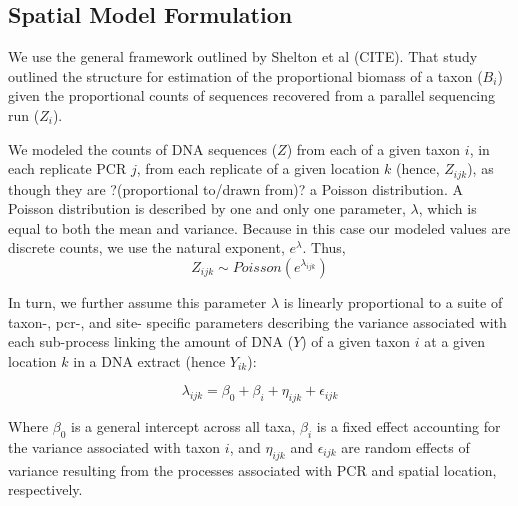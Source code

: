 \documentclass[11pt,letterpaper]{article} %
\begin{document}
\subsection*{Spatial Model Formulation}
We use the general framework outlined by Shelton et al (CITE).
That study outlined the structure for estimation of the proportional biomass of a taxon ($B_i$) given the proportional counts of sequences recovered from a parallel sequencing run ($Z_i$).

We modeled the counts of DNA sequences ($Z$) from each of a given taxon $i$, in each replicate PCR $j$, from each replicate of a given location $k$ (hence, $Z_{ijk}$), as though they are ?(proportional to/drawn from)? a Poisson distribution. A Poisson distribution is described by one and only one parameter, $\lambda$, which is equal to both the mean and variance. Because in this case our modeled values are discrete counts, we use the natural exponent, $e^\lambda$. %
Thus,
\begin{equation}\label{some_cool_eqn_name}
	Z_{ijk} \sim Poisson(e^{\lambda_{ijk}})
\end{equation}

In turn, we further assume this parameter $\lambda$ is linearly proportional to a suite of taxon-, pcr-, and site- specific parameters describing the variance associated with each sub-process linking the amount of DNA ($Y$) of a given taxon $i$ at a given location $k$ in a DNA extract (hence $Y_{ik}$):

\begin{equation}\label{GLM}
	\lambda_{ijk} = \beta_0 + \beta_i + \eta_{ijk} + \epsilon_{ijk}
\end{equation}

Where $\beta_0$ is a general intercept across all taxa, $\beta_i$ is a fixed effect accounting for the variance associated with taxon $i$, and $\eta_{ijk}$ and $\epsilon_{ijk}$ are random effects of variance resulting from the processes associated with PCR and spatial location, respectively.




%
\end{document}
